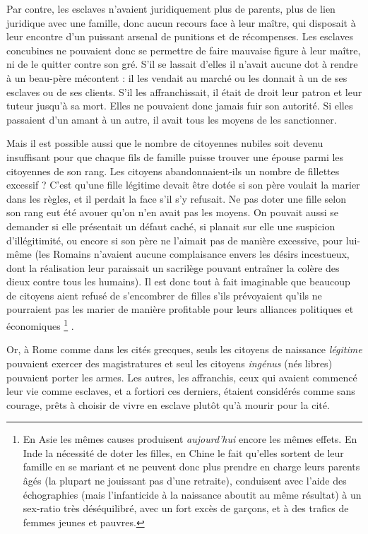  Par contre, les esclaves n'avaient juridiquement plus de parents, plus de lien juridique avec une famille, donc aucun recours face à leur maître, qui disposait à leur encontre d'un puissant arsenal de punitions et de récompenses. Les esclaves concubines ne pouvaient donc se permettre de faire mauvaise figure à leur maître, ni de le quitter contre son gré. S'il se lassait d'elles il n'avait aucune dot à rendre à un beau-père mécontent : il les vendait au marché ou les donnait à un de ses esclaves ou de ses clients. S'il les affranchissait, il était de droit leur patron et leur tuteur jusqu'à sa mort. Elles ne pouvaient donc jamais fuir son autorité. Si elles passaient d'un amant à un autre, il avait tous les moyens de les sanctionner.

 Mais il est possible aussi que le nombre de citoyennes nubiles soit devenu insuffisant pour que chaque fils de famille puisse trouver une épouse parmi les citoyennes de son rang. Les citoyens aban\-don\-naient-ils un nombre de fillettes excessif ? C'est qu'une fille légitime devait être dotée si son père voulait la marier dans les règles, et il perdait la face s'il s'y refusait. Ne pas doter une fille selon son rang eut été avouer qu'on n'en avait pas les moyens. On pouvait aussi se demander si elle présentait un défaut caché, si planait sur elle une suspicion d'illégitimité, ou encore si son père ne l'aimait pas de manière excessive, pour lui-même (les Romains n'avaient aucune complaisance envers les désirs incestueux, dont la réalisation leur paraissait un sacrilège pouvant entraîner la colère des dieux contre tous les humains). Il est donc tout à fait imaginable que beaucoup de citoyens aient refusé de s'encombrer de filles s'ils prévoyaient qu'ils ne pourraient pas les marier de manière profitable pour leurs alliances politiques et économiques%
\footnote{En Asie les mêmes causes produisent \emph{aujourd'hui} encore les mêmes effets. En Inde la nécessité de doter les filles, en Chine le fait qu'elles sortent de leur famille en se mariant et ne peuvent donc plus prendre en charge leurs parents âgés (la plupart ne jouissant pas d'une retraite), conduisent avec l'aide des échographies (mais l'infanticide à la naissance aboutit au même résultat) à un sex-ratio très déséquilibré, avec un fort excès de garçons, et à des trafics de femmes jeunes et pauvres.}%
. 

 Or, à Rome comme dans les cités grecques, seuls les citoyens de naissance \emph{légitime} pouvaient exercer des magistratures et seul les citoyens \emph{ingénus} (nés libres) pouvaient porter les armes. Les autres, les affranchis, ceux qui avaient commencé leur vie comme esclaves, et a fortiori ces derniers, étaient considérés comme sans courage, prêts à choisir de vivre en esclave plutôt qu'à mourir pour la cité. 

